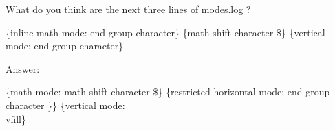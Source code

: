 What do you think are the next three
lines of modes.log ?

\{inline math mode: end-group character\}
\{math shift character \$\}
\{vertical mode: end-group character\}

Answer:

\{math mode: math shift character \$\}
\{restricted horizontal mode: end-group character \}\}
\{vertical mode: \\vfill\}

\bye
